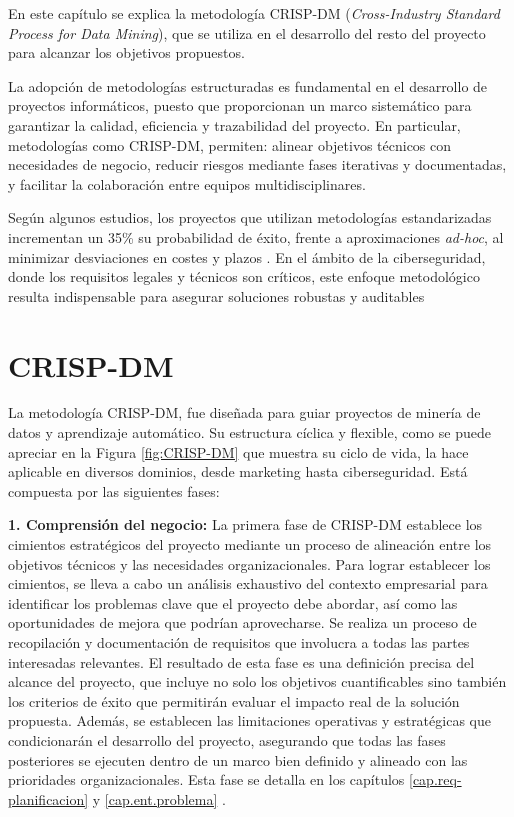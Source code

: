 
En este capítulo se explica la metodología CRISP-DM (\textit{Cross-Industry Standard Process for Data Mining}), que se utiliza en el desarrollo del resto del proyecto para alcanzar los objetivos propuestos.

La adopción de metodologías estructuradas es fundamental en el desarrollo de proyectos informáticos, puesto que proporcionan un marco sistemático para garantizar la calidad, eficiencia y trazabilidad del proyecto. En particular, metodologías como CRISP-DM, permiten: alinear objetivos técnicos con necesidades de negocio, reducir riesgos mediante fases iterativas y documentadas, y facilitar la colaboración entre equipos multidisciplinares.

Según algunos estudios, los proyectos que utilizan metodologías estandarizadas incrementan un 35\% su probabilidad de éxito, frente a aproximaciones \textit{ad-hoc}, al minimizar desviaciones en costes y plazos \cite{chapman2000crisp}. En el ámbito de la ciberseguridad, donde los requisitos legales y técnicos son críticos, este enfoque metodológico resulta indispensable para asegurar soluciones robustas y auditables

\section{CRISP-DM}
La metodología CRISP-DM, fue diseñada para guiar proyectos de minería de datos y aprendizaje automático. Su estructura cíclica y flexible, como se puede apreciar en la Figura \ref{fig:CRISP-DM} que muestra su ciclo de vida, la hace aplicable en diversos dominios, desde marketing hasta ciberseguridad. Está compuesta por las siguientes fases:

\textbf{1. Comprensión del negocio:} La primera fase de CRISP-DM establece los cimientos estratégicos del proyecto mediante un proceso de alineación entre los objetivos técnicos y las necesidades organizacionales. Para lograr establecer los cimientos, se lleva a cabo un análisis exhaustivo del contexto empresarial para identificar los problemas clave que el proyecto debe abordar, así como las oportunidades de mejora que podrían aprovecharse. Se realiza un proceso de recopilación y documentación de requisitos que involucra a todas las partes interesadas relevantes. El resultado de esta fase es una definición precisa del alcance del proyecto, que incluye no solo los objetivos cuantificables sino también los criterios de éxito que permitirán evaluar el impacto real de la solución propuesta. Además, se establecen las limitaciones operativas y estratégicas que condicionarán el desarrollo del proyecto, asegurando que todas las fases posteriores se ejecuten dentro de un marco bien definido y alineado con las prioridades organizacionales. Esta fase se detalla en los capítulos \ref{cap.req-planificacion}  y \ref{cap.ent.problema} .


